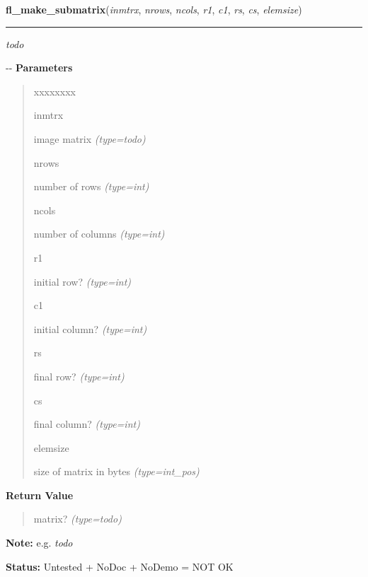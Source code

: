 \hspace{.8\funcindent}\begin{boxedminipage}{\funcwidth}

    \raggedright \textbf{fl\_make\_submatrix}(\textit{inmtrx}, \textit{nrows}, \textit{ncols}, \textit{r1}, \textit{c1}, \textit{rs}, \textit{cs}, \textit{elemsize})

    \vspace{-1.5ex}

    \rule{\textwidth}{0.5\fboxrule}
\setlength{\parskip}{2ex}

\emph{todo}

-{}-
\setlength{\parskip}{1ex}
      \textbf{Parameters}
      \vspace{-1ex}

      \begin{quote}
        \begin{Ventry}{xxxxxxxx}

          \item[inmtrx]


image matrix
            {\it (type=\emph{todo})}

          \item[nrows]


number of rows
            {\it (type=int)}

          \item[ncols]


number of columns
            {\it (type=int)}

          \item[r1]


initial row?
            {\it (type=int)}

          \item[c1]


initial column?
            {\it (type=int)}

          \item[rs]


final row?
            {\it (type=int)}

          \item[cs]


final column?
            {\it (type=int)}

          \item[elemsize]


size of matrix in bytes
            {\it (type=int\_pos)}

        \end{Ventry}

      \end{quote}

      \textbf{Return Value}
    \vspace{-1ex}

      \begin{quote}

matrix?
      {\it (type=\emph{todo})}

      \end{quote}

\textbf{Note:} 
e.g. \emph{todo}


\textbf{Status:} 
Untested + NoDoc + NoDemo = NOT OK


    \end{boxedminipage}

